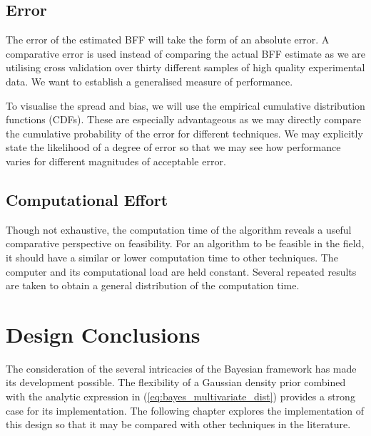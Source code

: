 \subsection{Error}
The error of the estimated BFF will take the form of an absolute error. A comparative error is used instead of comparing the actual BFF estimate as we are utilising cross validation over thirty different samples of high quality experimental data. We want to establish a generalised measure of performance.

To visualise the spread and bias, we will use the empirical cumulative distribution functions (CDFs). These are especially advantageous as we may directly compare the cumulative probability of the error for different techniques. We may explicitly state the likelihood of a degree of error so that we may see how performance varies for different magnitudes of acceptable error.

\subsection{Computational Effort}
Though not exhaustive, the computation time of the algorithm reveals a useful comparative perspective on feasibility. For an algorithm to be feasible in the field, it should have a similar or lower computation time to other techniques. The computer and its computational load are held constant. Several repeated results are taken to obtain a general distribution of the computation time.


\section{Design Conclusions}
The consideration of the several intricacies of the Bayesian framework has made its development possible. The flexibility of a Gaussian density prior combined with the analytic expression in (\ref{eq:bayes_multivariate_dist}) provides a strong case for its implementation. The following chapter explores the implementation of this design so that it may be compared with other techniques in the literature.




